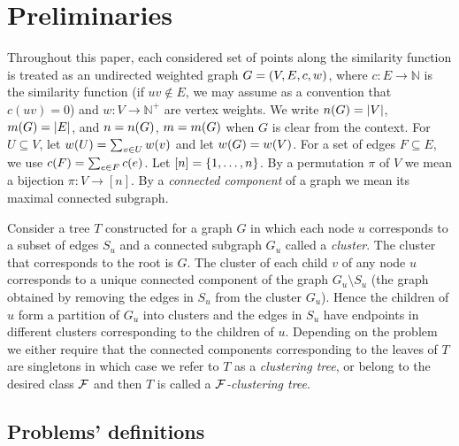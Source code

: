 \section{Preliminaries}

Throughout this paper, each considered set of points along the similarity function is treated as an undirected weighted graph $G=\mathopen{}\left( V,E,c,w \right)$, where $c\colon E\to \mathbb{N}$ is the similarity function (if $uv\notin E$, we may assume as a convention that $c(uv)=0$) and $w\colon V\to \mathbb{N}^+$ are vertex weights. We write $n\mathopen{}\left( G \right)=\mathopen{}\left| V \right|$, $m\mathopen{}\left( G \right)=\mathopen{}\left| E \right|$, and $n=n\mathopen{}\left( G \right)$, $m=m\mathopen{}\left( G \right)$ when $G$ is clear from the context. For $U\subseteq V$, let $w\mathopen{}\left( U \right)=\sum_{v\in U} w(v)$ and let $w\mathopen{}\left( G \right)=w\mathopen{}\left( V \right)$. For a set of edges $F\subseteq E$, we use $c\mathopen{}\left( F \right)=\sum_{e\in F} c(e)$. Let $[n]=\mathopen{}\left\{ 1,\dots, n \right\}$.
By a permutation $\pi$ of $V$ we mean a bijection $\pi\colon V\to [n]$.
By a \emph{connected component} of a graph we mean its maximal connected subgraph.

Consider a tree $T$ constructed for a graph $G$ in which each node $u$ corresponds to a subset of edges $S_u$ and a connected subgraph $G_u$ called a \emph{cluster}.
The cluster that corresponds to the root is $G$.
The cluster of each child $v$ of any node $u$ corresponds to a unique connected component of the graph $G_u\setminus S_u$ (the graph obtained by removing the edges in $S_u$ from the cluster $G_u$).
Hence the children of $u$ form a partition of $G_u$ into clusters and the edges in $S_u$ have endpoints in different clusters corresponding to the children of $u$.
Depending on the problem we either require that the connected components corresponding to the leaves of $T$ are singletons in which case we refer to $T$ as a \emph{clustering tree}, or belong to the desired class $\mathcal{F}$ and then $T$ is called a \emph{$\mathcal{F}$-clustering tree}.

\subsection{Problems' definitions}\label{subsec:problems-definitions}

